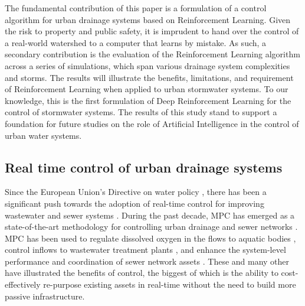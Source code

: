 The fundamental contribution of this paper is a formulation of a control algorithm for urban drainage systems based on Reinforcement Learning.
Given the risk to property and public safety, it is imprudent to hand over the control of a real-world watershed to a computer that learns by mistake.
As such, a secondary contribution is the evaluation of the Reinforcement Learning algorithm across a series of simulations, which span various drainage system complexities and storms.
The results will illustrate the benefits, limitations, and requirement of Reinforcement Learning when applied to urban stormwater systems.
To our knowledge, this is the first formulation of Deep Reinforcement Learning for the control of stormwater systems.
The results of this study stand to support a foundation for future studies on the role of Artificial Intelligence in the control of urban water systems.

\subsection{\textbf{Real time control of urban drainage systems}}


Since the European Union’s Directive on water policy \cite{TheEuropeanParliamentandthecouncilofEuropeanUnion2000}, there has been a significant push towards the adoption of real-time control for improving wastewater and sewer systems \cite{Schutze2004RealToday,Mollerup2016}.
During the past decade, MPC has emerged as a state-of-the-art methodology for  controlling urban drainage and sewer networks .
MPC has been used to regulate dissolved oxygen in the flows to aquatic bodies \cite{Mahmoodian2017Pollution-basedPropagation}, control inflows to wastewater treatment plants \cite{pleau2005global}, and enhance the system-level performance and coordination of sewer network assets \cite{Mollerup2016,Meneses2018CoordinatingDenmark}.
These and many other   \cite{wong2018real} have illustrated the benefits of control, the biggest of which is the ability to cost-effectively re-purpose existing assets in real-time without the need to build more passive infrastructure.

